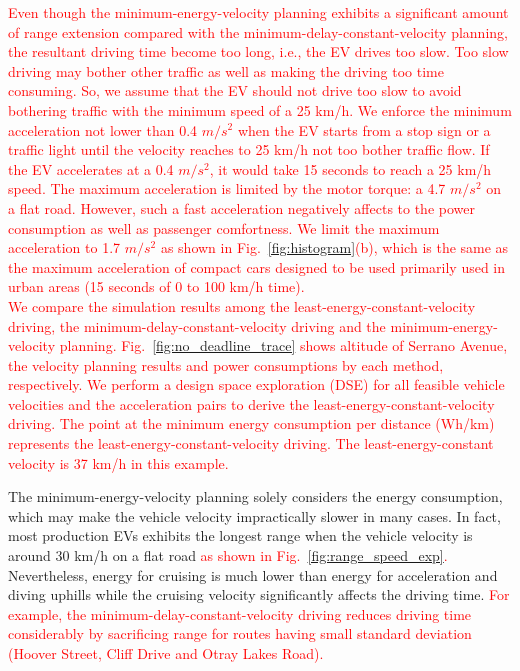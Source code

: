 \documentclass{IEEEtran}
\begin{document}
\textcolor{red}{Even though the minimum-energy-velocity planning exhibits a significant amount of range extension compared with the minimum-delay-constant-velocity planning, the resultant driving time become too long, i.e., the EV drives too slow. Too slow driving may bother other traffic as well as making the driving too time consuming. So, we assume that the EV should not drive too slow to avoid bothering traffic with the minimum speed of a 25 km/h. %
%
We enforce the minimum acceleration not lower than 0.4 $m/s^2$ when the EV starts from a stop sign or a traffic light until the velocity reaches to 25 km/h not too bother traffic flow. If the EV accelerates at a 0.4 $m/s^2$, it would take 15 seconds to reach a 25 km/h speed. 
%
The maximum acceleration is limited by the motor torque: a 4.7 $m/s^2$ on a flat road.  However, such a fast acceleration negatively affects to the  power consumption as well as passenger comfortness. We limit the maximum acceleration to 1.7 $m/s^2$ as shown in Fig.~\ref{fig:histogram}(b), which is the same as the maximum acceleration of compact cars designed to be used primarily used in urban areas (15 seconds of 0 to 100 km/h time).}\\


\textcolor{red}{We compare the simulation results among the least-energy-constant-velocity driving, the minimum-delay-constant-velocity driving and the minimum-energy-velocity planning. Fig.~\ref{fig:no_deadline_trace} shows altitude of Serrano Avenue, the velocity planning results and power consumptions by each method, respectively. 
We perform a design space exploration (DSE) for all feasible vehicle velocities and the acceleration pairs to derive the least-energy-constant-velocity driving. The point at the minimum energy consumption per distance (Wh/km) represents the least-energy-constant-velocity driving. The least-energy-constant velocity is 37 km/h in this example.}

The minimum-energy-velocity planning solely considers the energy consumption, which may make the vehicle velocity impractically slower in many cases. 
In fact, most production EVs exhibits the longest range when the vehicle velocity is around 30 km/h on a flat road \textcolor{red}{as shown in Fig.~\ref{fig:range_speed_exp}.} Nevertheless, energy for cruising is much lower than energy for acceleration and diving uphills while the cruising velocity significantly affects the driving time. \textcolor{red}{For example, the minimum-delay-constant-velocity driving reduces driving time considerably by sacrificing range for routes having small standard deviation (Hoover Street, Cliff Drive and Otray Lakes Road).}
\end{document}
